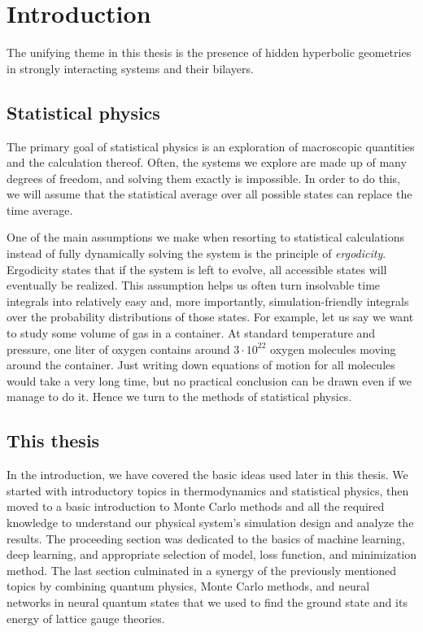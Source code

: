 \chapter{Introduction}
\label{ch:Intro}
\par
The unifying theme in this thesis is the presence of hidden hyperbolic geometries in strongly interacting systems and their bilayers. 
\newpage     
\section{Statistical physics}
\label{sec:statPhys}
The primary goal of statistical physics is an exploration of macroscopic quantities and the calculation thereof. Often, the systems we explore are made up of many degrees of freedom, and solving them exactly is impossible. In order to do this, we will assume that the statistical average over all possible states can replace the time average. 
\par 
One of the main assumptions we make when resorting to statistical calculations instead of fully dynamically solving the system is the principle of \textit{ergodicity}. Ergodicity states that if the system is left to evolve, all accessible states will eventually be realized. This assumption helps us often turn insolvable time integrals into relatively easy and, more importantly, simulation-friendly integrals over the probability distributions of those states. For example, let us say we want to study some volume of gas in a container. At standard temperature and pressure, one liter of oxygen contains around $3\cdot 10^{22}$ oxygen molecules moving around the container. Just writing down equations of motion for all molecules would take a very long time, but no practical conclusion can be drawn even if we manage to do it. Hence we turn to the methods of statistical physics.
\par


\section{This thesis}
In the introduction, we have covered the basic ideas used later in this thesis. We started with introductory topics in thermodynamics and statistical physics, then moved to a basic introduction to Monte Carlo methods and all the required knowledge to understand our physical system's simulation design and analyze the results. The proceeding section was dedicated to the basics of machine learning, deep learning, and appropriate selection of model, loss function, and minimization method. The last section culminated in a synergy of the previously mentioned topics by combining quantum physics, Monte Carlo methods, and neural networks in neural quantum states that we used to find the ground state and its energy of lattice gauge theories.

